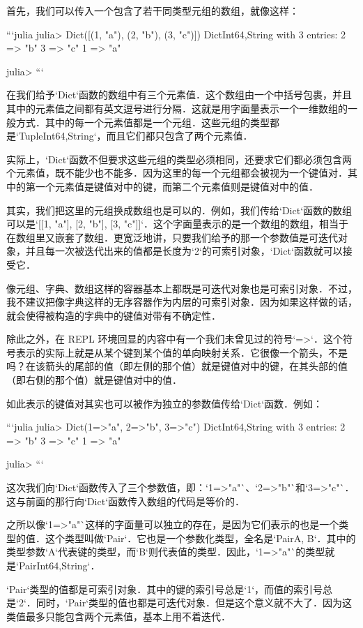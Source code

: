 首先，我们可以传入一个包含了若干同类型元组的数组，就像这样：

```julia
julia> Dict([(1, "a"), (2, "b"), (3, "c")])
Dict{Int64,String} with 3 entries:
  2 => "b"
  3 => "c"
  1 => "a"

julia> 
```

在我们给予`Dict`函数的数组中有三个元素值．这个数组由一个中括号包裹，并且其中的元素值之间都有英文逗号进行分隔．这就是用字面量表示一个一维数组的一般方式．其中的每一个元素值都是一个元组．这些元组的类型都是`Tuple{Int64,String}`，而且它们都只包含了两个元素值．

实际上，`Dict`函数不但要求这些元组的类型必须相同，还要求它们都必须包含两个元素值，既不能少也不能多．因为这里的每一个元组都会被视为一个键值对．其中的第一个元素值是键值对中的键，而第二个元素值则是键值对中的值．

其实，我们把这里的元组换成数组也是可以的．例如，我们传给`Dict`函数的数组可以是`[[1, "a"], [2, "b"], [3, "c"]]`．这个字面量表示的是一个数组的数组，相当于在数组里又嵌套了数组．更宽泛地讲，只要我们给予的那一个参数值是可迭代对象，并且每一次被迭代出来的值都是长度为`2`的可索引对象，`Dict`函数就可以接受它．

像元组、字典、数组这样的容器基本上都既是可迭代对象也是可索引对象．不过，我不建议把像字典这样的无序容器作为内层的可索引对象．因为如果这样做的话，就会使得被构造的字典中的键值对带有不确定性．

除此之外，在 REPL 环境回显的内容中有一个我们未曾见过的符号`=>`．这个符号表示的实际上就是从某个键到某个值的单向映射关系．它很像一个箭头，不是吗？在该箭头的尾部的值（即左侧的那个值）就是键值对中的键，在其头部的值（即右侧的那个值）就是键值对中的值．

如此表示的键值对其实也可以被作为独立的参数值传给`Dict`函数．例如：

```julia
julia> Dict(1=>"a", 2=>"b", 3=>"c")
Dict{Int64,String} with 3 entries:
  2 => "b"
  3 => "c"
  1 => "a"

julia> 
```

这次我们向`Dict`函数传入了三个参数值，即：`1=>"a"`、`2=>"b"`和`3=>"c"`．这与前面的那行向`Dict`函数传入数组的代码是等价的．

之所以像`1=>"a"`这样的字面量可以独立的存在，是因为它们表示的也是一个类型的值．这个类型叫做`Pair`．它也是一个参数化类型，全名是`Pair{A, B}`．其中的类型参数`A`代表键的类型，而`B`则代表值的类型．因此，`1=>"a"`的类型就是`Pair{Int64,String}`．

`Pair`类型的值都是可索引对象．其中的键的索引号总是`1`，而值的索引号总是`2`．同时，`Pair`类型的值也都是可迭代对象．但是这个意义就不大了．因为这类值最多只能包含两个元素值，基本上用不着迭代．

